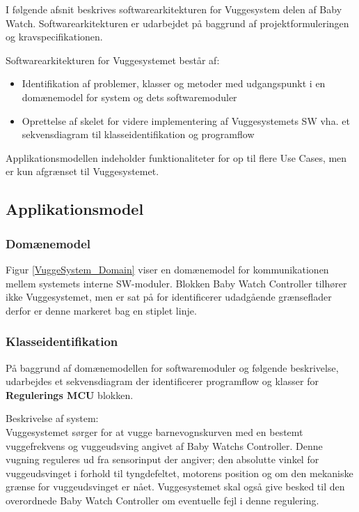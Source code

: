 I følgende afsnit beskrives softwarearkitekturen for Vuggesystem delen af Baby Watch. Softwarearkitekturen er udarbejdet på baggrund af projektformuleringen og kravspecifikationen. 

\vspace{5mm}

Softwarearkitekturen for Vuggesystemet består af: 
\begin{itemize}
\item Identifikation af problemer, klasser og metoder med udgangspunkt i en domænemodel for system og dets softwaremoduler  
\item Oprettelse af skelet for videre implementering af Vuggesystemets SW vha. et sekvensdiagram til klasseidentifikation og programflow
\end{itemize}

Applikationsmodellen indeholder funktionaliteter for op til flere Use Cases, men er kun afgrænset til Vuggesystemet. 

\vspace{2mm}
\subsection*{Applikationsmodel} 
\subsubsection*{Domænemodel} 


\vspace{1mm}
Figur \ref{VuggeSystem_Domain} viser en domænemodel for kommunikationen mellem systemets interne SW-moduler. Blokken Baby Watch Controller tilhører ikke Vuggesystemet, men er sat på for identificerer udadgående grænseflader derfor er denne markeret bag en stiplet linje.

\subsubsection*{Klasseidentifikation}
På baggrund af domænemodellen for softwaremoduler og følgende beskrivelse, udarbejdes et sekvensdiagram der identificerer programflow og klasser  for \textbf{Regulerings MCU} blokken.\\
\vspace{1mm}

Beskrivelse af system:\\
Vuggesystemet sørger for at vugge barnevognskurven med en bestemt vuggefrekvens og vuggeudsving angivet af Baby Watchs Controller. Denne vugning reguleres ud fra sensorinput der angiver; den absolutte vinkel for vuggeudsvinget i forhold til tyngdefeltet, motorens position og om den mekaniske grænse for vuggeudsvinget er nået. Vuggesystemet skal også give besked til den overordnede Baby Watch Controller om eventuelle fejl i denne regulering.


